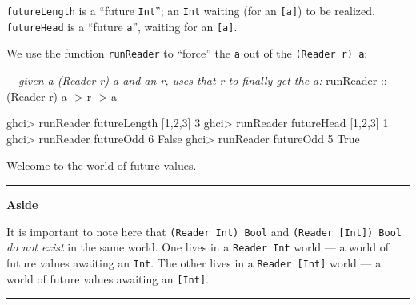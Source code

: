 \documentclass[]{article}
\newenvironment{Shaded}{}{}
\newcommand{\CommentTok}[1]{\textcolor[rgb]{0.38,0.63,0.69}{\textit{#1}}}
\newcommand{\DataTypeTok}[1]{\textcolor[rgb]{0.56,0.13,0.00}{#1}}
\newcommand{\DecValTok}[1]{\textcolor[rgb]{0.25,0.63,0.44}{#1}}
\newcommand{\NormalTok}[1]{#1}
\newcommand{\OperatorTok}[1]{\textcolor[rgb]{0.40,0.40,0.40}{#1}}
\newcommand{\OtherTok}[1]{\textcolor[rgb]{0.00,0.44,0.13}{#1}}
\begin{document}
\texttt{futureLength} is a ``future \texttt{Int}''; an \texttt{Int} waiting (for
an \texttt{{[}a{]}}) to be realized. \texttt{futureHead} is a ``future
\texttt{a}'', waiting for an \texttt{{[}a{]}}.

We use the function \texttt{runReader} to ``force'' the \texttt{a} out of the
\texttt{(Reader\ r)\ a}:

\begin{Shaded}
\begin{Highlighting}[]
\CommentTok{{-}{-} given a \textasciigrave{}(Reader r) a\textasciigrave{} and an \textasciigrave{}r\textasciigrave{}, uses that \textasciigrave{}r\textasciigrave{} to finally get the \textasciigrave{}a\textasciigrave{}:}
\OtherTok{runReader ::}\NormalTok{ (}\DataTypeTok{Reader}\NormalTok{ r) a }\OtherTok{{-}\textgreater{}}\NormalTok{ r }\OtherTok{{-}\textgreater{}}\NormalTok{ a}
\end{Highlighting}
\end{Shaded}

\begin{Shaded}
\begin{Highlighting}[]
\NormalTok{ghci}\OperatorTok{\textgreater{}}\NormalTok{ runReader futureLength [}\DecValTok{1}\NormalTok{,}\DecValTok{2}\NormalTok{,}\DecValTok{3}\NormalTok{]}
\DecValTok{3}
\NormalTok{ghci}\OperatorTok{\textgreater{}}\NormalTok{ runReader futureHead [}\DecValTok{1}\NormalTok{,}\DecValTok{2}\NormalTok{,}\DecValTok{3}\NormalTok{]}
\DecValTok{1}
\NormalTok{ghci}\OperatorTok{\textgreater{}}\NormalTok{ runReader futureOdd }\DecValTok{6}
\DataTypeTok{False}
\NormalTok{ghci}\OperatorTok{\textgreater{}}\NormalTok{ runReader futureOdd }\DecValTok{5}
\DataTypeTok{True}
\end{Highlighting}
\end{Shaded}

Welcome to the world of future values.

\begin{center}\rule{0.5\linewidth}{0.5pt}\end{center}

\textbf{Aside}

It is important to note here that \texttt{(Reader\ Int)\ Bool} and
\texttt{(Reader\ {[}Int{]})\ Bool} \emph{do not exist} in the same world. One
lives in a \texttt{Reader\ Int} world --- a world of future values awaiting an
\texttt{Int}. The other lives in a \texttt{Reader\ {[}Int{]}} world --- a world
of future values awaiting an \texttt{{[}Int{]}}.

\begin{center}\rule{0.5\linewidth}{0.5pt}\end{center}
\end{document}
